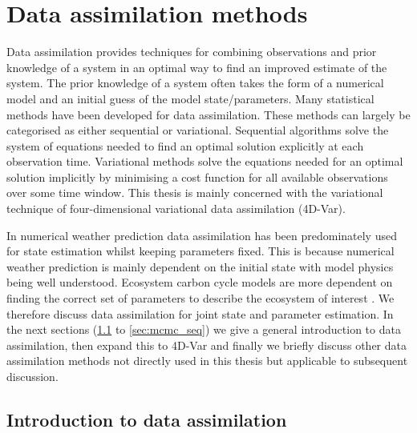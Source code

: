 

\section{Data assimilation methods}

Data assimilation provides techniques for combining observations and prior knowledge of a system in an optimal way to find an improved estimate of the system. The prior knowledge of a system often takes the form of a numerical model and an initial guess of the model state/parameters. Many statistical methods have been developed for data assimilation. These methods can largely be categorised as either sequential or variational. Sequential algorithms solve the system of equations needed to find an optimal solution explicitly at each observation time. Variational methods solve the equations needed for an optimal solution implicitly by minimising a cost function for all available observations over some time window. This thesis is mainly concerned with the variational technique of four-dimensional variational data assimilation (4D-Var). 

In numerical weather prediction data assimilation has been predominately used for state estimation whilst keeping parameters fixed. This is because numerical weather prediction is mainly dependent on the initial state with model physics being well understood. Ecosystem carbon cycle models are more dependent on finding the correct set of parameters to describe the ecosystem of interest \citep{luo2015predictability}. We therefore discuss data assimilation for joint state and parameter estimation. In the next sections (\ref{sec:intro_da} to \ref{sec:mcmc_seq}) we give a general introduction to data assimilation, then expand this to 4D-Var and finally we briefly discuss other data assimilation methods not directly used in this thesis but applicable to subsequent discussion. 

\subsection{Introduction to data assimilation} \label{sec:intro_da}

